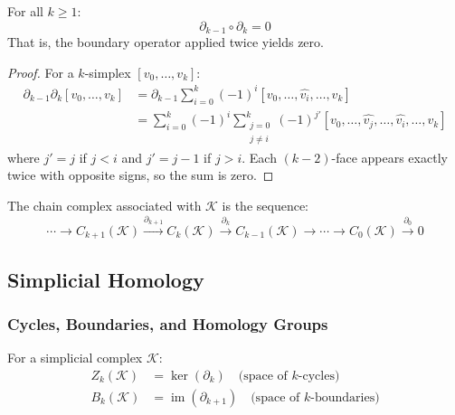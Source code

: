\begin{theorem}\label{thm:frontera_frontera_cero}
For all $k \geq 1$:
\begin{equation}
    \partial_{k-1} \circ \partial_k = 0
\end{equation}
That is, the boundary operator applied twice yields zero.
\end{theorem}

\begin{proof}
For a $k$-simplex $[v_0, \ldots, v_k]$:
\begin{align}
    \partial_{k-1} \partial_k[v_0, \ldots, v_k] &= \partial_{k-1} \sum_{i=0}^k (-1)^i [v_0, \ldots, \hat{v_i}, \ldots, v_k] \\
    &= \sum_{i=0}^k (-1)^i \sum_{\substack{j=0 \\ j \neq i}}^k (-1)^{j'} [v_0, \ldots, \hat{v_j}, \ldots, \hat{v_i}, \ldots, v_k]
\end{align}
where $j' = j$ if $j < i$ and $j' = j-1$ if $j > i$. Each $(k-2)$-face appears exactly twice with opposite signs, so the sum is zero.
\end{proof}

\begin{definition}\label{def:complejo_cadenas}
The chain complex associated with $\mathcal{K}$ is the sequence:
\begin{equation}
    \cdots \to C_{k+1}(\mathcal{K}) \xrightarrow{\partial_{k+1}} C_k(\mathcal{K}) \xrightarrow{\partial_k} C_{k-1}(\mathcal{K}) \to \cdots \to C_0(\mathcal{K}) \xrightarrow{\partial_0} 0
\end{equation}
\end{definition}

\subsection{Simplicial Homology}

\subsubsection{Cycles, Boundaries, and Homology Groups}

\begin{definition}\label{def:ciclos_fronteras}
For a simplicial complex $\mathcal{K}$:
\begin{align}
    Z_k(\mathcal{K}) &= \ker(\partial_k) \quad \text{(space of } k\text{-cycles)} \\
    B_k(\mathcal{K}) &= \operatorname{im}(\partial_{k+1}) \quad \text{(space of } k\text{-boundaries)}
\end{align}
\end{definition}


